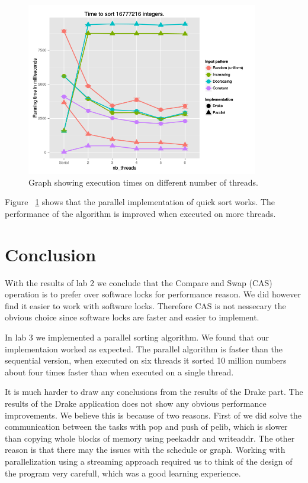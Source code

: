 \documentclass[a4paper,12pt]{article}
\begin{document}
\begin{figure}[H]
  \centering
  \includegraphics[width=0.9\textwidth]{lab3_time_threads.png}
  \caption{Graph showing execution times on different number of threads.}
  \label{fig:lab3timethreads}
\end{figure}

Figure ~\ref{fig:lab3timethreads} shows that the parallel implementation of quick sort works. The performance of the algorithm is improved when executed on more threads. 


\section{Conclusion}
With the results of lab 2 we conclude that the Compare and Swap (CAS) operation is to prefer over software locks for performance reason. We did however find it easier to work with software locks. Therefore CAS is not nessecary the obvious choice since software locks are faster and easier to implement. 

In lab 3 we implemented a parallel sorting algorithm. We found that our implementaion worked as expected. The parallel algorithm is faster than the sequential version, when executed on six threads it sorted 10 million numbers about four times faster than when executed on a single thread.

It is much harder to draw any conclusions from the results of the Drake part. The results of the Drake application does not show any obvious performance improvements. We believe this is because of two reasons. First of we did solve the communication between the tasks with pop and push of pelib, which is slower than copying whole blocks of memory using peekaddr and writeaddr. The other reason is that there may the issues with the schedule or graph. Working with parallelization using a streaming approach required us to think of the design of the program very carefull, which was a good learning experience. 
\end{document}
